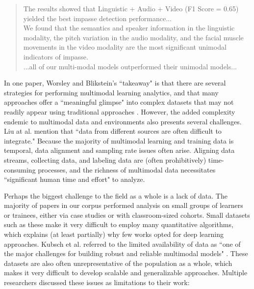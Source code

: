 \documentclass[manuscript,screen,review]{acmart}
\begin{document}
\begin{quote}
    The results showed that Linguistic + Audio + Video (F1 Score = 0.65) yielded the best impasse detection performance...\\

    We found that the semantics and speaker information in the linguistic modality, the pitch variation in the audio modality, and the facial muscle movements in the video modality are the most significant unimodal indicators of impasse.\\

    ...all of our multi-modal models outperformed their unimodal models...
\end{quote}

In one paper, Worsley and Blikstein's ``takeaway" is that there are several strategies for performing multimodal learning analytics, and that many approaches offer a ``meaningful glimpse" into complex datasets that may not readily appear using traditional approaches \cite{3095923626}. However, the added complexity endemic to multimodal data and environments also presents several challenges. Liu at al. \cite{3783339081} mention that ``data from different sources are often difficult to integrate." Because the majority of multimodal learning and training data is temporal, data alignment and sampling rate issues often arise. Aligning data streams, collecting data, and labeling data are (often prohibitively) time-consuming processes, and the richness of multimodal data necessitates ``significant human time and effort" \cite{3796180663} to analyze.  

Perhaps the biggest challenge to the field as a whole is a lack of data. The majority of papers in our corpus performed analysis on small groups of learners or trainees, either via case studies or with classroom-sized cohorts. Small datasets such as these make it very difficult to employ many quantitative algorithms, which explains (at least partially) why few works opted for deep learning approaches. Kubsch et al. referred to the limited availability of data as ``one of the major challenges for building robust and reliable multimodal models" \cite{32184286}. These datasets are also often unrepresentative of the population as a whole, which makes it very difficult to develop scalable and generalizable approaches. Multiple researchers discussed these issues as limitations to their work:
\end{document}
